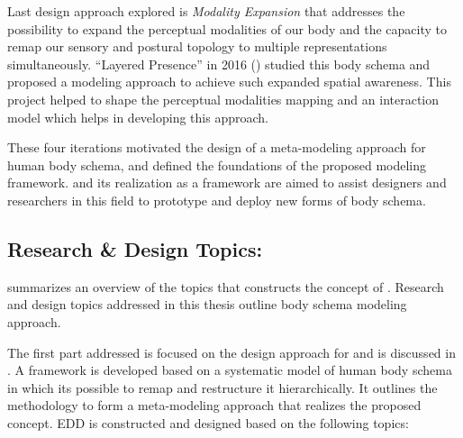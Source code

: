 Last design approach explored is \textit{Modality Expansion} that addresses the possibility to expand the perceptual modalities of our body and the capacity to remap our sensory and postural topology to multiple representations simultaneously. ``Layered Presence'' in 2016 () studied this body schema and proposed a modeling approach to achieve such expanded spatial awareness. This project helped to shape the perceptual modalities mapping and an interaction model which helps in developing this approach.

These four iterations motivated the design of a meta-modeling approach for human body schema, and defined the foundations of the proposed modeling framework. \ProposalKeyword and its realization as a framework are aimed to assist designers and researchers in this field to prototype and deploy new forms of body schema.








\subsection{Research \& Design Topics:}


 summarizes an overview of the topics that constructs the concept of \ProposalKeyword. Research and design topics addressed in this thesis outline body schema modeling approach.

The first part addressed is focused on the design approach for \ProposalKeyword and is discussed in . A framework is developed based on a systematic model of human body schema in which its possible to remap and restructure it hierarchically. It outlines the methodology to form a meta-modeling approach that realizes the proposed concept. EDD is constructed and designed based on the following topics:

